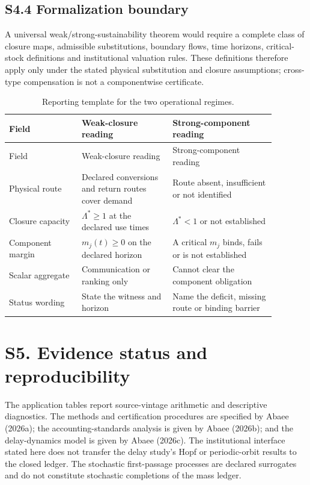 \documentclass[11pt]{article}
\begin{document}
\subsection*{S4.4 Formalization boundary}

A universal weak/strong-sustainability theorem would require a complete class of closure maps, admissible substitutions, boundary flows, time horizons, critical-stock definitions and institutional valuation rules. These definitions therefore apply only under the stated physical substitution and closure assumptions; cross-type compensation is not a componentwise certificate.

\begin{longtable}{@{}P{0.24\linewidth}P{0.30\linewidth}P{0.34\linewidth}@{}}
\caption{Reporting template for the two operational regimes.}\label{tab:regimes}\\
\toprule
Field & Weak-closure reading & Strong-component reading \\
\midrule
\endfirsthead
\toprule
Field & Weak-closure reading & Strong-component reading \\
\midrule
\endhead
\bottomrule
\endfoot
Physical route & Declared conversions and return routes cover demand & Route absent, insufficient or not identified \\
Closure capacity & $\Lambda^*\geq1$ at the declared use times & $\Lambda^*<1$ or not established \\
Component margin & $m_j(t)\geq0$ on the declared horizon & A critical $m_j$ binds, fails or is not established \\
Scalar aggregate & Communication or ranking only & Cannot clear the component obligation \\
Status wording & State the witness and horizon & Name the deficit, missing route or binding barrier \\
\end{longtable}

\section*{S5. Evidence status and reproducibility}

The application tables report source-vintage arithmetic and descriptive diagnostics. The methods and certification procedures are specified by Abaee (2026a); the accounting-standards analysis is given by Abaee (2026b); and the delay-dynamics model is given by Abaee (2026c). The institutional interface stated here does not transfer the delay study's Hopf or periodic-orbit results to the closed ledger. The stochastic first-passage processes are declared surrogates and do not constitute stochastic completions of the mass ledger.
\end{document}
